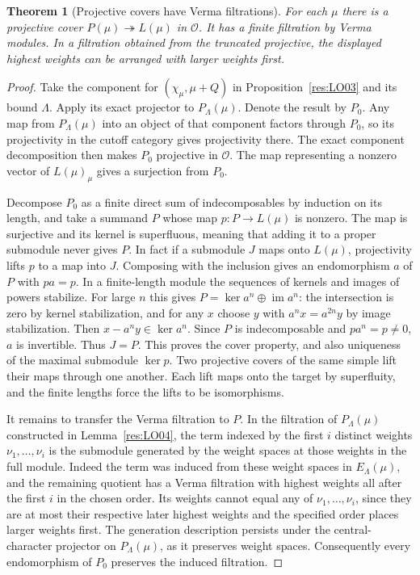\documentclass[11pt,oneside,openany]{book}
\newtheorem{theorem}{Theorem}[chapter]
\theoremstyle{definition}
\theoremstyle{remark}
\begin{document}
\begin{theorem}[Projective covers have Verma filtrations]
\label{res:LO05}
For each \(\mu\) there is a projective cover
\(P(\mu)\twoheadrightarrow L(\mu)\) in \(\mathcal O\).
It has a finite filtration by Verma modules. In a filtration
obtained from the truncated projective, the displayed highest
weights can be arranged with larger weights first.
\end{theorem}
\begin{proof}
Take the component for \((\chi_\mu,\mu+Q)\) in
Proposition~\ref{res:LO03} and its bound \(\Lambda\).
Apply its exact projector to \(P_\Lambda(\mu)\). Denote the
result by \(P_0\). Any map from \(P_\Lambda(\mu)\) into an object
of that component factors through \(P_0\), so its projectivity
in the cutoff category gives projectivity there. The exact
component decomposition then makes \(P_0\) projective in
\(\mathcal O\). The map representing a nonzero vector of
\(L(\mu)_\mu\) gives a surjection from \(P_0\).

Decompose \(P_0\) as a finite direct sum of indecomposables by
induction on its length, and take a summand \(P\) whose map
\(p:P\to L(\mu)\) is nonzero. The map is surjective and its
kernel is superfluous, meaning that adding it to a proper
submodule never gives \(P\). In fact if a submodule \(J\) maps
onto \(L(\mu)\), projectivity lifts \(p\) to a map into \(J\).
Composing with the inclusion gives an endomorphism \(a\) of \(P\)
with \(pa=p\). In a finite-length module the sequences of kernels
and images of powers stabilize. For large \(n\) this gives
\(P=\ker a^n\oplus\operatorname{im}a^n\): the intersection is
zero by kernel stabilization, and for any \(x\) choose \(y\)
with \(a^nx=a^{2n}y\) by image stabilization.
Then \(x-a^ny\in\ker a^n\). Since \(P\) is indecomposable and \(pa^n=p\ne0\),
\(a\) is invertible. Thus \(J=P\). This proves the cover property,
and also uniqueness of the maximal submodule \(\ker p\).
Two projective covers of the same simple lift their maps through
one another. Each lift maps onto the target by superfluity,
and the finite lengths force the lifts to be isomorphisms.

It remains to transfer the Verma filtration to \(P\).
In the filtration of \(P_\Lambda(\mu)\) constructed in
Lemma~\ref{res:LO04}, the term indexed by the first \(i\) distinct
weights \(\nu_1,\ldots,\nu_i\) is the submodule generated by the
weight spaces at those weights in the full module. Indeed the
term was induced from these weight spaces in \(E_\Lambda(\mu)\),
and the remaining quotient has a Verma filtration with highest
weights all after the first \(i\) in the chosen order.
Its weights cannot equal any of \(\nu_1,\ldots,\nu_i\), since
they are at most their respective later highest weights and
the specified order places larger weights first. The generation
description persists under the central-character projector on
\(P_\Lambda(\mu)\), as it preserves weight spaces. Consequently
every endomorphism of \(P_0\) preserves the induced filtration.


\end{proof}
\end{document}
